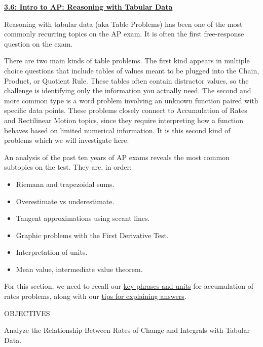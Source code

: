 \textbf{\underline{\large{3.6: Intro to AP: Reasoning with Tabular Data}}} \par

Reasoning with tabular data (aka Table Problems) has been one of the most commonly recurring topics on the AP exam. It is often the first free-response question on the exam. \par

There are two main kinds of table problems. The first kind appears in multiple choice questions that include tables of values meant to be plugged into the Chain, Product, or Quotient Rule. These tables often contain distractor values, so the challenge is identifying only the information you actually need. The second and more common type is a word problem involving an unknown function paired with specific data points. These problems closely connect to Accumulation of Rates and Rectilinear Motion topics, since they require interpreting how a function behaves based on limited numerical information. It is this second kind of problems which we will investigate here. \par

An analysis of the past ten years of AP exams reveals the most common subtopics on the test. They are, in order: \par

\begin{itemize}
    \item Riemann and trapezoidal sums.
    \item Overestimate vs underestimate.
    \item Tangent approximations using secant lines.
    \item Graphic problems with the First Derivative Test.
    \item Interpretation of units.
    \item Mean value, intermediate value theorem.
\end{itemize}

For this section, we need to recall our \hyperlink{key phrases and units}{key phrases and units} for accumulation of rates problems, along with our \hyperlink{tips for explaining answers}{tips for explaining answers}.

\begin{tcolorbox}[objective]
    \begin{center}
        OBJECTIVES \\[11pt]
    \end{center}
    Analyze the Relationship Between Rates of Change and Integrals with Tabular Data.
\end{tcolorbox}

